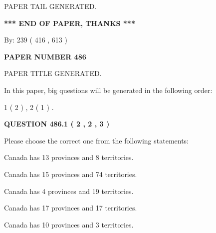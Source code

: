 \documentclass[12pt]{article}
\begin{document}
   
   
\vspace{2.0in} PAPER TAIL GENERATED.
   
   
   
   
\vspace{1.0in} 
{\textbf{\large{ *** END OF PAPER, THANKS *** }}} 
   
   
\hspace{1.0in} By: 
 239 ( 416 ,  613 )
   
   
   
   
\newpage 
\setcounter{page}{ 
   486001 } 
   
   
   
   
 {\textbf{ \Large{ PAPER NUMBER  486  }}}
   
   
\vspace{0.2in}
   
   
   
   
   
   
   
   
 \vspace{0.2in}
 
 
 
 
   
   
 PAPER TITLE GENERATED.
   
   
   
\vspace{0.2in}
   
In this paper, big questions will be generated in the following order: 
   
   
   1 ( 2 )
 ,
   2 ( 1 )
 .
  
\vspace{0.2in}
  
{\textbf{\Large{QUESTION
486.1 
 ( 2 , 2 , 3 )
}}}
  
  
Please choose the correct one from the following statements:
 
 
Canada has  13 provinces and  8 territories.
 
 
Canada has  15 provinces and  74 territories.
 
 
Canada has   4 provinces and  19 territories.
 
 
Canada has  17 provinces and  17 territories.
 
 
Canada has 10  provinces and 3 territories.
 
\end{document}
